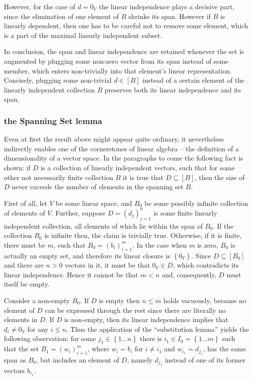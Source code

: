 \documentclass[a4paper]{article}
\newcommand{\obj}[1]{\ensuremath{\left\{ #1 \right\}}}
\newcommand{\brac}[1]{\ensuremath{\left( #1 \right)}}
\newcommand{\spn}[1]{\ensuremath{\left[ #1 \right]}}
\begin{document}
However, for the case of $d = 0_V$ the linear independence plays a decisive part, since the elimination of one element of $B$ shrinks its span. However if $B$ is linearly dependent, then one has to be careful not to remove some element, which is a part of the maximal linearly independent subset.

In conclusion, the span and linear independence are retained whenever the set is augmented by plugging some non-zero vector from its span instead of some member, which enters non-trivially into that element's linear representation. Concisely, plugging some non-trivial $d\in \spn{B}$ instead of a certain element of the linearly independent collection $B$ preserves both its linear independence and its span.

\subsubsection{the Spanning Set lemma} %
\label{ssub:the_spanning_set_lemma}
Even at first the result above might appear quite ordinary, it nevertheless indirectly enables one of the cornerstones of linear algebra -- the definition of a dimensionality of a vector space. In the paragraphs to come the following fact is shown: if $D$ is a collection of linearly independent vectors, such that for some other not necessarily finite collection $B$ it is true that $D\subseteq \spn{B}$, then the size of $D$ never exceeds the number of elements in the spanning set $B$.

First of all, let $V$ be some linear space, and $B_0$ be some possibly infinite collection of elements of $V$. Further, suppose $D=\brac{d_j}_{j=1}^n$ is some finite linearly independent collection, all elements of which lie within the span of $B_0$.
If the collection $B_0$ is infinite then, the claim is trivially true. Otherwise, if it is finite, there must be $m$, such that $B_0 = \brac{b_i}_{i=1}^m$.
In the case when $m$ is zero, $B_0$ is actually an empty set, and therefore its linear closure is $\obj{0_V}$. Since $D\subseteq \spn{B_0}$ and there are $n > 0$ vectors in it, it must be that $0_V\in D$, which contradicts its linear independence. Hence it cannot be that $m<n$ and, consequently, $D$ must itself be empty.

Consider a non-empty $B_0$. If $D$ is empty then $n\leq m$ holds vacuously, because no element of $D$ can be expressed through the rest since there are literally no elements in $D$.
If $D$ is non-empty, then its linear independence implies that $d_i\neq 0_V$ for any $i\leq n$. Thus the application of the ``substitution lemma'' yields the following observation: for some $j_1\in \obj{1\ldots n}$ there is $i_1\in I_0 = \obj{1\ldots m}$ such that the set $B_1 = \brac{w_i}_{i=1}^m$, where $w_i=b_i$ for $i\neq i_1$ and $w_{i_1}=d_{j_1}$, has the same span as $B_0$, but includes an element of $D$, namely $d_{j_1}$ instead of one of its former vectors $b_{i_1}$.
\end{document}
